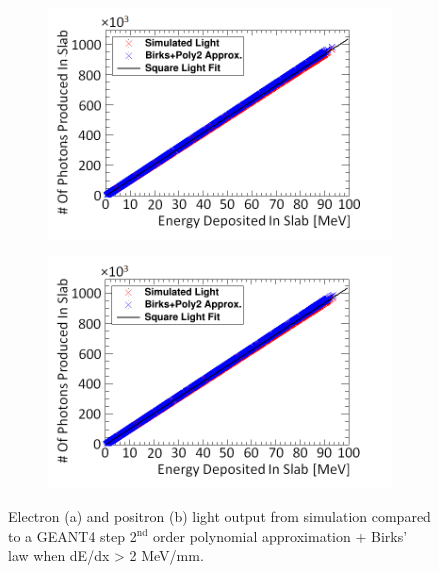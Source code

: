\begin{figure}[!h]
\centering
\begin{subfigure}{.5\textwidth}
  \centering
  \includegraphics[width=\linewidth]{Chapter4/Figs/Raster/electronSimulatedLightBirksAndPoly2New.png}
  \captionsetup{width=.9\linewidth}
  \caption{}
  \label{subFig:square_electron_light}
\end{subfigure}%
\begin{subfigure}{.5\textwidth}
  \centering
  \includegraphics[width=\linewidth]{Chapter4/Figs/Raster/positronSimulatedLightBirksAndPoly2New.png}
  \captionsetup{width=.9\linewidth}
  \caption{}
  \label{subFig:square_positron_light}
\end{subfigure}
\caption[Electron and positron light approximations compared to GEANT4. ]{Electron (a) and positron (b) light output from simulation compared to a GEANT4 step 2$^\textrm{nd}$ order polynomial approximation + Birks' law when dE/dx > 2 MeV/mm.}
\label{fig:square_electron_positron_light}
\end{figure}

